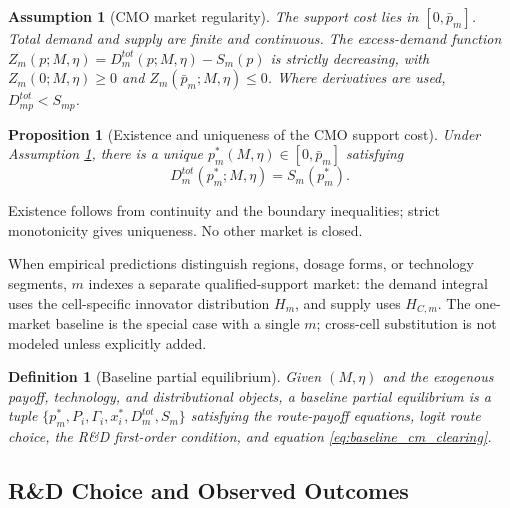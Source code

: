 \documentclass[12pt]{article}
\newtheorem{proposition}{Proposition}
\newtheorem{definition}{Definition}
\newtheorem{assumption}{Assumption}
\newcommand{\1}{\mathbf{1}}
\begin{document}
\begin{assumption}[CMO market regularity]
\label{ass:cmo_regular}
The support cost lies in $[0,\bar p_m]$. Total demand and supply are finite and continuous. The excess-demand function $Z_m(p;M,\eta)=D_m^{tot}(p;M,\eta)-S_m(p)$ is strictly decreasing, with $Z_m(0;M,\eta)\ge0$ and $Z_m(\bar p_m;M,\eta)\le0$. Where derivatives are used, $D_{mp}^{tot}<S_{mp}$.
\end{assumption}

\begin{proposition}[Existence and uniqueness of the CMO support cost]
\label{prop:cmo_existence}
Under Assumption \ref{ass:cmo_regular}, there is a unique $p_m^*(M,\eta)\in[0,\bar p_m]$ satisfying
\begin{equation}
    D_m^{tot}(p_m^*;M,\eta)=S_m(p_m^*).
    \label{eq:baseline_cm_clearing}
\end{equation}
\end{proposition}

\noindent Existence follows from continuity and the boundary inequalities; strict monotonicity gives uniqueness. No other market is closed.

When empirical predictions distinguish regions, dosage forms, or technology segments, $m$ indexes a separate qualified-support market: the demand integral uses the cell-specific innovator distribution $H_m$, and supply uses $H_{C,m}$. The one-market baseline is the special case with a single $m$; cross-cell substitution is not modeled unless explicitly added.

\begin{definition}[Baseline partial equilibrium]
\label{def:partial_equilibrium}
Given $(M,\eta)$ and the exogenous payoff, technology, and distributional objects, a baseline partial equilibrium is a tuple $\{p_m^*,P_i,\Gamma_i,x_i^*,D_m^{tot},S_m\}$ satisfying the route-payoff equations, logit route choice, the R\&D first-order condition, and equation \eqref{eq:baseline_cm_clearing}.
\end{definition}

\subsection{R\&D Choice and Observed Outcomes}
\end{document}
